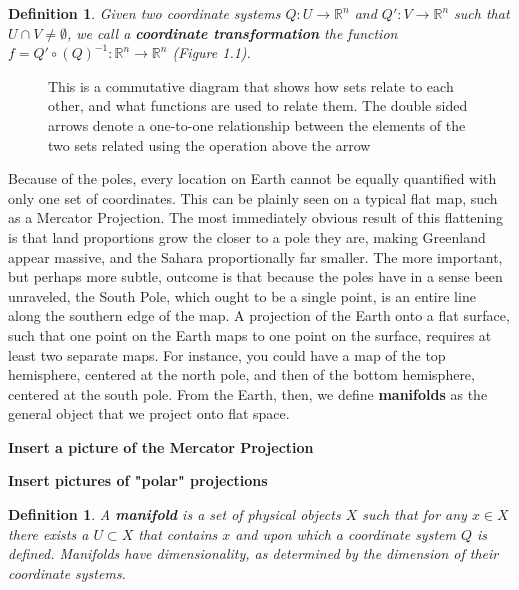 \documentclass{book}
\newtheorem{defn}[equation]{Definition}
\begin{document}
\begin{defn}
	Given two coordinate systems  $Q : U \to \mathbb{R}^n$ and $Q' : V \to \mathbb{R}^n$ such that $U \cap V \neq \emptyset$, we call a \textbf{coordinate transformation} the function $f = Q' \circ (Q)^{-1} : \mathbb{R}^n \to \mathbb{R}^n$ (Figure 1.1).
\end{defn}




\begin{figure}[h]
\begin{center}
\end{center}
\caption{This is a commutative diagram that shows how sets relate to each other, and what functions are used to relate them. The double sided arrows denote a one-to-one relationship between the elements of the two sets related using the operation above the arrow}
\end{figure}


Because of the poles, every location on Earth cannot be equally quantified with only one set of coordinates. This can be plainly seen on a typical flat map, such as a Mercator Projection. The most immediately obvious result of this flattening is that land proportions grow the closer to a pole they are, making Greenland appear massive, and the Sahara proportionally far smaller. The more important, but perhaps more subtle, outcome is that because the poles have in a sense been unraveled, the South Pole, which ought to be a single point, is an entire line along the southern edge of the map. A projection of the Earth onto a flat surface, such that one point on the Earth maps to one point on the surface, requires at least two separate maps. For instance, you could have a map of the top hemisphere, centered at the north pole, and then of the bottom hemisphere, centered at the south pole. From the Earth, then, we define \textbf{manifolds} as the general object that we project onto flat space. 


\textbf{Insert a picture of the Mercator Projection}

\textbf{Insert pictures of "polar" projections}

\begin{defn}
	A \textbf{manifold} is a set of physical objects $X$ such that for any $x \in X$ there exists a $U \subset X$ that contains $x$ and upon which a coordinate system $Q$ is defined. Manifolds have dimensionality, as determined by the dimension of their coordinate systems.
\end{defn}
\end{document}
